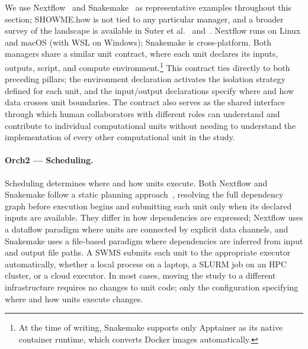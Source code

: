 \documentclass{eceasst}
\begin{document}
We use Nextflow~\cite{ditommaso2017nextflow} and
Snakemake~\cite{molder2021snakemake} as representative examples throughout
this section; SHOWME.how is not tied to any particular manager, and a broader
survey of the landscape is available in Suter et al.~\cite{suter2025terminology}
and~\cite{diercks2023evaluation}. Nextflow runs on Linux and
macOS (with WSL on Windows); Snakemake is cross-platform. Both managers share a similar unit contract,
where each unit declares its inputs, outputs, script, and compute
environment.\footnote{At the time of writing, Snakemake supports only Apptainer as its
native container runtime, which converts Docker images automatically.} This contract
ties directly to both preceding pillars; the environment declaration activates
the isolation strategy defined for each unit, and the input/output declarations
specify where and how data crosses unit boundaries.
The contract also serves as the shared interface through which human collaborators
with different roles can understand and contribute to individual computational units
without needing to understand the implementation of every other computational unit in the study.

\paragraph{Orch2 --- Scheduling.}
Scheduling determines where and how units execute. Both Nextflow and Snakemake
follow a static planning approach~\cite{suter2025terminology}, resolving the
full dependency graph before execution begins and submitting each unit only
when its declared inputs are available. They differ in how dependencies are
expressed; Nextflow uses a dataflow paradigm where units are connected by
explicit data channels, and Snakemake uses a file-based paradigm where
dependencies are inferred from input and output file paths. A SWMS
submits each unit to the appropriate executor automatically, whether a local
process on a laptop, a SLURM job on an HPC cluster, or a cloud executor. In most cases, moving the study to a different
infrastructure requires no changes
to unit code; only the configuration specifying where and how units execute
changes.
\end{document}
